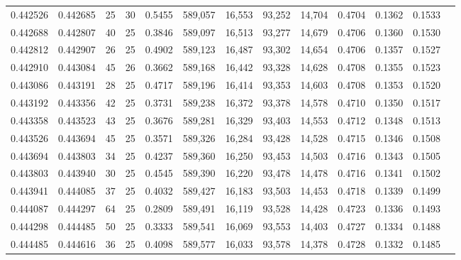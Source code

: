 \begin{tabular}{rrrrrrrrrrrrr}
0.442526 & 0.442685 &    25 &  30 &                                     0.5455 & 589,057 &  16,553 &  93,252 &  14,704 & 0.4704 & 0.1362 & 0.1533 \\
0.442688 & 0.442807 &    40 &  25 &                                     0.3846 & 589,097 &  16,513 &  93,277 &  14,679 & 0.4706 & 0.1360 & 0.1530 \\
0.442812 & 0.442907 &    26 &  25 &                                     0.4902 & 589,123 &  16,487 &  93,302 &  14,654 & 0.4706 & 0.1357 & 0.1527 \\
0.442910 & 0.443084 &    45 &  26 &                                     0.3662 & 589,168 &  16,442 &  93,328 &  14,628 & 0.4708 & 0.1355 & 0.1523 \\
0.443086 & 0.443191 &    28 &  25 &                                     0.4717 & 589,196 &  16,414 &  93,353 &  14,603 & 0.4708 & 0.1353 & 0.1520 \\
0.443192 & 0.443356 &    42 &  25 &                                     0.3731 & 589,238 &  16,372 &  93,378 &  14,578 & 0.4710 & 0.1350 & 0.1517 \\
0.443358 & 0.443523 &    43 &  25 &                                     0.3676 & 589,281 &  16,329 &  93,403 &  14,553 & 0.4712 & 0.1348 & 0.1513 \\
0.443526 & 0.443694 &    45 &  25 &                                     0.3571 & 589,326 &  16,284 &  93,428 &  14,528 & 0.4715 & 0.1346 & 0.1508 \\
0.443694 & 0.443803 &    34 &  25 &                                     0.4237 & 589,360 &  16,250 &  93,453 &  14,503 & 0.4716 & 0.1343 & 0.1505 \\
0.443803 & 0.443940 &    30 &  25 &                                     0.4545 & 589,390 &  16,220 &  93,478 &  14,478 & 0.4716 & 0.1341 & 0.1502 \\
0.443941 & 0.444085 &    37 &  25 &                                     0.4032 & 589,427 &  16,183 &  93,503 &  14,453 & 0.4718 & 0.1339 & 0.1499 \\
0.444087 & 0.444297 &    64 &  25 &                                     0.2809 & 589,491 &  16,119 &  93,528 &  14,428 & 0.4723 & 0.1336 & 0.1493 \\
0.444298 & 0.444485 &    50 &  25 &                                     0.3333 & 589,541 &  16,069 &  93,553 &  14,403 & 0.4727 & 0.1334 & 0.1488 \\
0.444485 & 0.444616 &    36 &  25 &                                     0.4098 & 589,577 &  16,033 &  93,578 &  14,378 & 0.4728 & 0.1332 & 0.1485 \\

\end{tabular}
